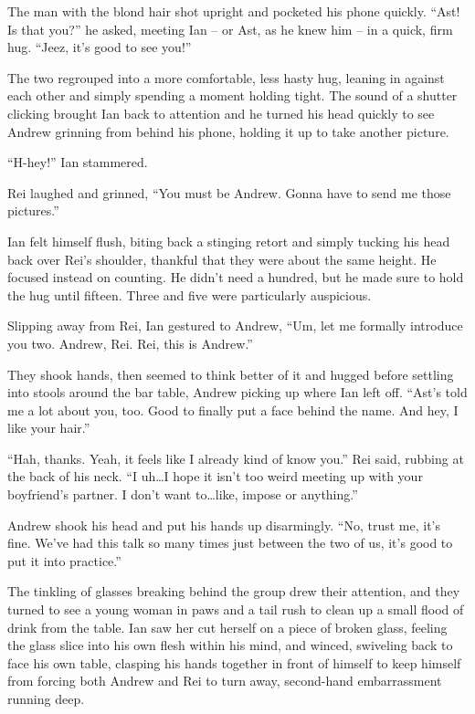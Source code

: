 The man with the blond hair shot upright and pocketed his phone quickly. ``Ast! Is that you?'' he asked, meeting Ian -- or Ast, as he knew him -- in a quick, firm hug. ``Jeez, it's good to see you!''

The two regrouped into a more comfortable, less hasty hug, leaning in against each other and simply spending a moment holding tight. The sound of a shutter clicking brought Ian back to attention and he turned his head quickly to see Andrew grinning from behind his phone, holding it up to take another picture.

``H-hey!'' Ian stammered.

Rei laughed and grinned, ``You must be Andrew. Gonna have to send me those pictures.''

Ian felt himself flush, biting back a stinging retort and simply tucking his head back over Rei's shoulder, thankful that they were about the same height. He focused instead on counting. He didn't need a hundred, but he made sure to hold the hug until fifteen. Three and five were particularly auspicious.

Slipping away from Rei, Ian gestured to Andrew, ``Um, let me formally introduce you two. Andrew, Rei. Rei, this is Andrew.''

They shook hands, then seemed to think better of it and hugged before settling into stools around the bar table, Andrew picking up where Ian left off. ``Ast's told me a lot about you, too. Good to finally put a face behind the name. And hey, I like your hair.''

``Hah, thanks. Yeah, it feels like I already kind of know you.'' Rei said, rubbing at the back of his neck. ``I uh\ldots{}I hope it isn't too weird meeting up with your boyfriend's partner. I don't want to\ldots{}like, impose or anything.''

Andrew shook his head and put his hands up disarmingly. ``No, trust me, it's fine. We've had this talk so many times just between the two of us, it's good to put it into practice.''

The tinkling of glasses breaking behind the group drew their attention, and they turned to see a young woman in paws and a tail rush to clean up a small flood of drink from the table. Ian saw her cut herself on a piece of broken glass, feeling the glass slice into his own flesh within his mind, and winced, swiveling back to face his own table, clasping his hands together in front of himself to keep himself from forcing both Andrew and Rei to turn away, second-hand embarrassment running deep.

